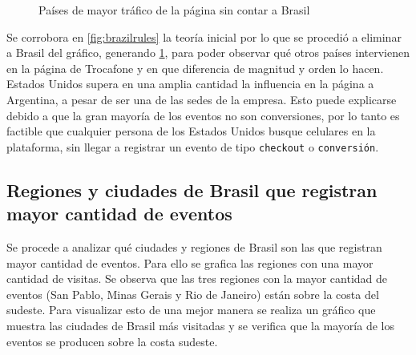 \documentclass[a4paper]{article}
\begin{document}
\begin{figure}[h!]
	\caption{Países de mayor tráfico de la página sin contar a Brasil}
	\label{fig:brazilsucks}
\end{figure}

Se corrobora en \ref{fig:brazilrules} la teoría inicial por lo que se procedió a eliminar a Brasil del gráfico, generando \ref{fig:brazilsucks}, para poder observar qué otros países intervienen en la página de Trocafone y en que diferencia de magnitud y orden lo hacen. Estados Unidos supera en una amplia cantidad la influencia en la página a Argentina, a pesar de ser una de las sedes de la empresa. Esto puede explicarse debido a que la gran mayoría de los eventos no son conversiones, por lo tanto es factible que cualquier persona de los Estados Unidos busque celulares en la plataforma, sin llegar a registrar un evento de tipo \texttt{checkout} o \texttt{conversión}.

\subsection{Regiones y ciudades de Brasil que registran mayor cantidad de eventos}

Se procede a analizar qué ciudades y regiones de Brasil son las que registran mayor cantidad de eventos. Para ello se grafica las regiones con una mayor cantidad de visitas. Se observa que las tres regiones con la mayor cantidad de eventos (San Pablo, Minas Gerais y Rio de Janeiro) están sobre la costa del sudeste. Para visualizar esto de una mejor manera se realiza un gráfico que muestra las ciudades de Brasil más visitadas y se verifica que la mayoría de los eventos se producen sobre la costa sudeste.
\end{document}
